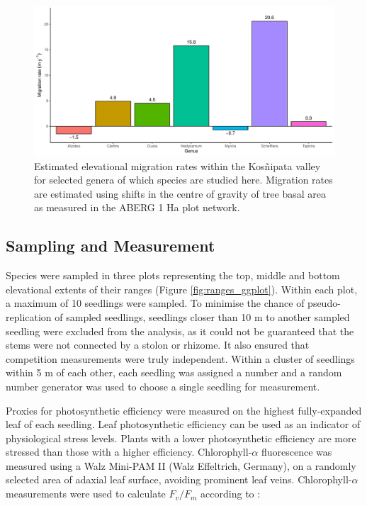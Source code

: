 \documentclass[a4paper, 11pt]{article}
\begin{document}
\begin{figure}[H]
\includegraphics[width=\textwidth]{mig}
\centering
\caption{Estimated elevational migration rates within the Kos\~{n}ipata valley for selected genera of which species are studied here. Migration rates are estimated using shifts in the centre of gravity of tree basal area as measured in the ABERG 1 Ha plot network.}
\label{mig}
\end{figure}


\subsection{Sampling and Measurement}
Species were sampled in three plots representing the top, middle and bottom elevational extents of their ranges (Figure \ref{fig:ranges_ggplot}). Within each plot, a maximum of 10 seedlings were sampled. To minimise the chance of pseudo-replication of sampled seedlings, seedlings closer than 10 m to another sampled seedling were excluded from the analysis, as it could not be guaranteed that the stems were not connected by a stolon or rhizome. It also ensured that competition measurements were truly independent. Within a cluster of seedlings within 5 m of each other, each seedling was assigned a number and a random number generator was used to choose a single seedling for measurement.

Proxies for photosynthetic efficiency were measured on the highest fully-expanded leaf of each seedling. Leaf photosynthetic efficiency can be used as an indicator of physiological stress levels. Plants with a lower photosynthetic efficiency are more stressed than those with a higher efficiency. Chlorophyll-$\alpha$ fluorescence was measured using a Walz Mini-PAM II (Walz Effeltrich, Germany), on a randomly selected area of adaxial leaf surface, avoiding prominent leaf veins. Chlorophyll-$\alpha$ measurements were used to calculate $F_v/F_m$ according to \citet{Genty1989}:
\end{document}
